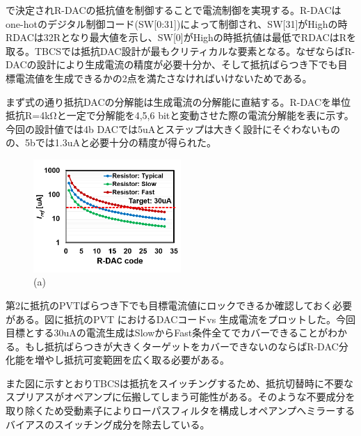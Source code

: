 \documentclass[letterpaper, 10 pt, conference]{ieeeconf}  %
\begin{document}
で決定されR-DACの抵抗値を制御することで電流制御を実現する。R-DACはone-hotのデジタル制御コード(SW[0:31])によって制御され、SW[31]がHighの時RDACは32Rとなり最大値を示し、SW[0]がHighの時抵抗値は最低でRDACはRを取る。TBCSでは抵抗DAC設計が最もクリティカルな要素となる。なぜならばR-DACの設計により生成電流の精度が必要十分か、そして抵抗ばらつき下でも目標電流値を生成できるかの2点を満たさなければいけないためである。

\begin{table}[]
\end{table}

まず式の通り抵抗DACの分解能は生成電流の分解能に直結する。R-DACを単位抵抗R=4kΩと一定で分解能を4,5,6 bitと変動させた際の電流分解能を表に示す。今回の設計値では4b DACでは5uAとステップは大きく設計にそぐわないものの、5bでは1.3uAと必要十分の精度が得られた。

\begin{figure}[!]
\centering
 \includegraphics[width=0.5\textwidth]{figs/rdaccode.png}
  \caption{(a) 
}
\label{fig2}
\end{figure}

第2に抵抗のPVTばらつき下でも目標電流値にロックできるか確認しておく必要がある。図に抵抗のPVT におけるDACコードvs 生成電流をプロットした。今回目標とする30uAの電流生成はSlowからFast条件全てでカバーできることがわかる。もし抵抗ばらつきが大きくターゲットをカバーできないのならばR-DAC分化能を増やし抵抗可変範囲を広く取る必要がある。

また図に示すとおりTBCSは抵抗をスイッチングするため、抵抗切替時に不要なスプリアスがオペアンプに伝搬してしまう可能性がある。そのような不要成分を取り除くため受動素子によりローパスフィルタを構成しオペアンプへミラーするバイアスのスイッチング成分を除去している。
\end{document}
